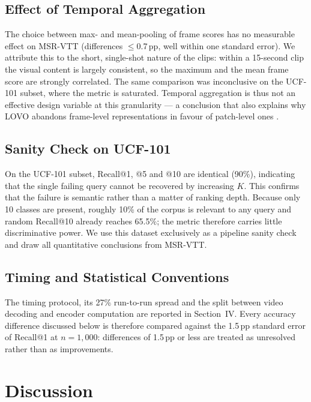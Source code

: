 \documentclass[journal]{IEEEtran}
\begin{document}
\subsection{Effect of Temporal Aggregation}
The choice between max- and mean-pooling of frame scores has no measurable effect on MSR-VTT
(differences $\leq$0.7\,pp, well within one standard error). We attribute this to the short,
single-shot nature of the clips: within a 15-second clip the visual content is largely
consistent, so the maximum and the mean frame score are strongly correlated. The same comparison
was inconclusive on the UCF-101 subset, where the metric is saturated. Temporal aggregation is
thus not an effective design variable at this granularity --- a conclusion that also explains why
LOVO abandons frame-level representations in favour of patch-level ones \cite{lovo2025}.

\subsection{Sanity Check on UCF-101}
On the UCF-101 subset, Recall@1, @5 and @10 are identical (90\%), indicating that the single
failing query cannot be recovered by increasing $K$. This confirms that the failure is semantic
rather than a matter of ranking depth. Because only 10 classes are present, roughly 10\% of the
corpus is relevant to any query and random Recall@10 already reaches 65.5\%; the metric therefore
carries little discriminative power. We use this dataset exclusively as a pipeline sanity check
and draw all quantitative conclusions from MSR-VTT.

\subsection{Timing and Statistical Conventions}
The timing protocol, its 27\% run-to-run spread and the split between video decoding and encoder
computation are reported in Section~IV. Every accuracy difference discussed below is therefore
compared against the 1.5\,pp standard error of Recall@1 at $n=1{,}000$: differences of 1.5\,pp or
less are treated as unresolved rather than as improvements.

\section{Discussion}\label{sec:discussion}
\end{document}
